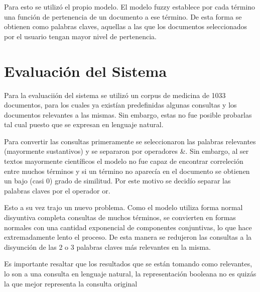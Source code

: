 \documentclass[]{article}
\begin{document}
 Para esto se utilizó el propio modelo. El modelo fuzzy establece por cada término una función de pertenencia de un documento a ese término. De esta forma se obtienen como palabras claves, aquellas a las que los documentos seleccionados por el usuario tengan mayor nivel de pertenencia. 

\section{Evaluación del Sistema}
\label{section:eval}
Para la evaluaciión del sistema se utilizó un corpus de medicina de 1033 documentos, para los cuales ya existían predefinidas algunas consultas y los documentos relevantes a las mismas. Sin embargo, estas no fue posible probarlas tal cual puesto que se expresan en lenguaje natural. 

Para convertir las consultas primeramente se seleccionaron las palabras relevantes (mayormente sustantivos) y se separaron por operadores \&. Sin embargo, al ser textos mayormente científicos el modelo no fue capaz de encontrar correleción entre muchos términos y si un término no aparecía en el documento se obtienen un bajo (casi 0) grado de similitud. Por este motivo se decidío separar las palabras claves por el operador or. 

Esto a su vez trajo un nuevo problema. Como el modelo utiliza forma normal disyuntiva completa consultas de muchos términos, se convierten en formas normales con una cantidad exponencial de componentes conjuntivas, lo que hace extremadamente lento el proceso. De esta manera se redujeron las consultas a la disyunción de las 2 o 3 palabras claves más relevantes en la misma.

Es importante resaltar que los resultados que se están tomando como relevantes, lo son a una consulta en lenguaje natural, la representación booleana no es quizás la que mejor representa la consulta original
\end{document}
